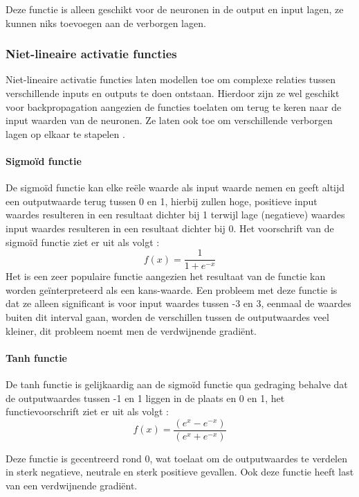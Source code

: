 {Deze functie is alleen geschikt voor de neuronen in de output en input lagen, ze kunnen niks toevoegen aan de verborgen lagen. 

\subsubsection{Niet-lineaire activatie functies}
Niet-lineaire activatie functies laten modellen toe om complexe relaties tussen verschillende inputs en outputs te doen ontstaan. Hierdoor zijn ze wel geschikt voor backpropagation aangezien de functies toelaten om terug te keren naar de input waarden van de neuronen. Ze laten ook toe om verschillende verborgen lagen op elkaar te stapelen . 

\paragraph{Sigmoïd functie}
De sigmoïd functie kan elke reële waarde als input waarde nemen en geeft altijd een outputwaarde terug tussen 0 en 1, hierbij zullen hoge, positieve input waardes resulteren in een resultaat dichter bij 1 terwijl lage (negatieve) waardes input waardes resulteren in een resultaat dichter bij 0. Het voorschrift van de sigmoïd functie ziet er uit als volgt : 
\[f(x) = \dfrac{1}{1 + e^{-x}}\]
Het is een zeer populaire functie aangezien het resultaat van de functie kan worden geïnterpreteerd als een kans-waarde. 
Een probleem met deze functie is dat ze alleen significant  is voor input waardes tussen -3 en 3, eenmaal de waardes buiten dit interval gaan, worden de verschillen tussen de outputwaardes veel kleiner, dit probleem noemt men de verdwijnende gradiënt. 

\paragraph{Tanh functie}
De tanh functie is gelijkaardig aan de sigmoïd functie qua gedraging behalve dat de outputwaardes tussen -1 en 1 liggen in de plaats en 0 en 1, het functievoorschrift ziet er uit als volgt : 
\[f(x) = \dfrac{(e^{x} - e^{-x})}{(e^{x}+ e^{-x})}\]

Deze functie is gecentreerd rond 0, wat toelaat om de outputwaardes te verdelen in sterk negatieve, neutrale en sterk positieve gevallen. Ook deze functie heeft last van een verdwijnende gradiënt. 

}
